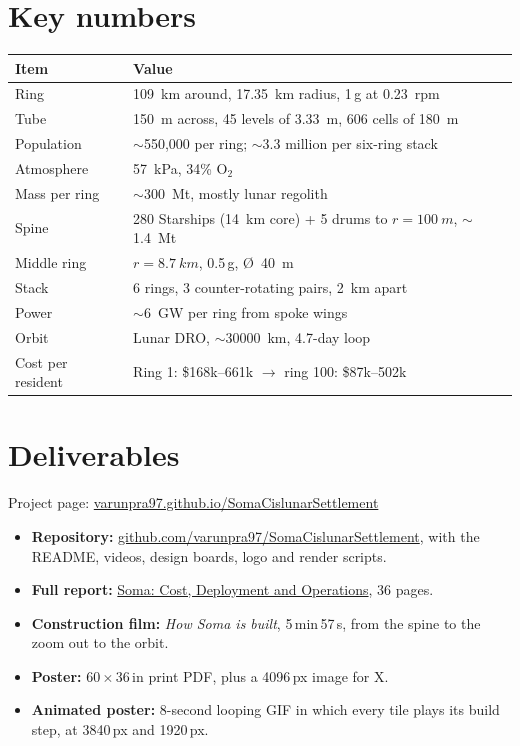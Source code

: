 \documentclass[11pt,a4paper]{article}
\newcommand{\repo}{\href{https://github.com/varunpra97/SomaCislunarSettlement}{github.com/varunpra97/SomaCislunarSettlement}}
\begin{document}
\section{Key numbers}
\begin{table}[H]
  \centering
  \begin{tabularx}{\textwidth}{@{}lX@{}}
    \toprule
    \textbf{Item} & \textbf{Value} \\
    \midrule
    Ring & \SI{109}{km} around, \SI{17.35}{km} radius, 1\,g at \SI{0.23}{rpm} \\
    Tube & \SI{150}{m} across, 45 levels of \SI{3.33}{m}, 606 cells of \SI{180}{m} \\
    Population & $\sim$550,000 per ring; $\sim$3.3 million per six-ring stack \\
    Atmosphere & \SI{57}{kPa}, 34\% O$_2$ \\
    Mass per ring & $\sim$\SI{300}{Mt}, mostly lunar regolith \\
    Spine & 280 Starships (\SI{14}{km} core) + 5 drums to $r = \SI{100}{m}$, $\sim$\SI{1.4}{Mt} \\
    Middle ring & $r = \SI{8.7}{km}$, 0.5\,g, \O\ \SI{40}{m} \\
    Stack & 6 rings, 3 counter-rotating pairs, \SI{2}{km} apart \\
    Power & $\sim$\SI{6}{GW} per ring from spoke wings \\
    Orbit & Lunar DRO, $\sim$\SI{30000}{km}, 4.7-day loop \\
    Cost per resident & Ring 1: \$168k--661k $\rightarrow$ ring 100: \$87k--502k \\
    \bottomrule
  \end{tabularx}
\end{table}

\section{Deliverables}
\noindent Project page: \href{https://varunpra97.github.io/SomaCislunarSettlement/}{varunpra97.github.io/SomaCislunarSettlement}

\begin{itemize}[leftmargin=1.2em,itemsep=0.3em]
  \item \textbf{Repository:} \repo, with the README, videos, design boards, logo and
  render scripts.
  \item \textbf{Full report:} \href{https://claude.ai/artifact/T8Bgr5gNkfa1cog84XKW5Q}{Soma: Cost, Deployment and Operations}, 36 pages.
  \item \textbf{Construction film:} \emph{How Soma is built}, 5\,min\,57\,s, from the
  spine to the zoom out to the orbit.
  \item \textbf{Poster:} $60 \times 36$\,in print PDF, plus a 4096\,px image for X.
  \item \textbf{Animated poster:} 8-second looping GIF in which every tile plays its
  build step, at 3840\,px and 1920\,px.
\end{itemize}
\end{document}
